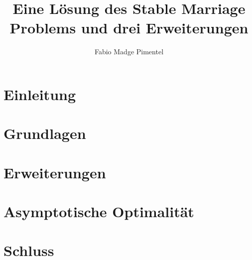 \documentclass[a4paper,draft]{article}
\begin{document}
\title{Eine Lösung des Stable Marriage Problems und drei Erweiterungen}
\author{Fabio Madge Pimentel}
\date{}
\maketitle

\begin{abstract}

\end{abstract}

\section{Einleitung}


\section{Grundlagen}


\section{Erweiterungen}


\section{Asymptotische Optimalität}


\section{Schluss}


\listofalgorithms



\end{document}
